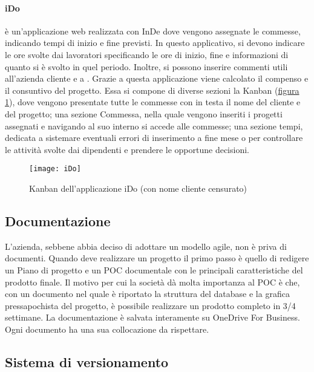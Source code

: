 \paragraph{iDo} è un'applicazione web realizzata con InDe dove vengono assegnate le commesse, indicando tempi di inizio e fine previsti. In questo applicativo, si devono indicare le ore svolte dai lavoratori specificando le ore di inizio, fine e informazioni di quanto si è svolto in quel periodo. Inoltre, si possono inserire commenti utili all'azienda cliente e a \azienda. 
Grazie a questa applicazione viene calcolato il compenso e il consuntivo del progetto. Essa si compone di diverse sezioni la Kanban (\hyperref[ido]{figura \ref{ido}}), dove vengono presentate tutte le commesse con in testa il nome del cliente e del progetto; una sezione Commessa, nella quale vengono inseriti i progetti assegnati e navigando al suo interno si accede alle commesse; una sezione tempi, dedicata a sistemare eventuali errori di inserimento a fine mese o per controllare le attività svolte dai dipendenti e prendere le opportune decisioni.

\begin{figure}[!h] 
	\centering 
	\texttt{[image: iDo]} 
	\caption{Kanban dell'applicazione iDo (con nome cliente censurato)}
	\label{ido}
\end{figure}



\subsection{Documentazione}
\label{cap1:Documentazione}

L'azienda, sebbene abbia deciso di adottare un modello agile, non è priva di documenti. Quando deve realizzare un progetto il primo passo è quello di redigere un Piano di progetto e un POC documentale con le principali caratteristiche del prodotto finale. 
Il motivo per cui la società dà molta importanza al POC è che, con un documento nel quale è riportato la struttura del database e la grafica pressapochista del progetto, è possibile realizzare un prodotto completo in 3/4 settimane. 
La documentazione è salvata interamente su OneDrive For Business. Ogni documento ha una sua collocazione da rispettare. 

\subsection{Sistema di versionamento}
\label{cap1:Sistema di versionamento}

